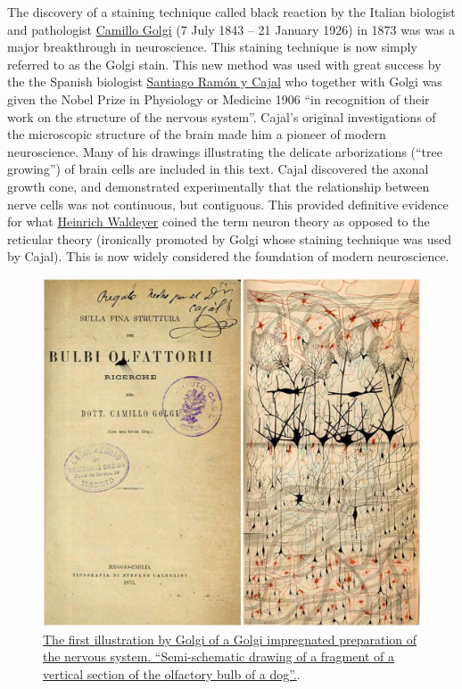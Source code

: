 The discovery of a staining technique called black reaction by the Italian biologist and pathologist \href{https://en.wikipedia.org/wiki/Camillo_Golgi}{Camillo Golgi} (7 July 1843 -- 21 January 1926) in 1873 was was a major breakthrough in neuroscience. This staining technique is now simply referred to as the Golgi stain. This new method was used with great success by the the Spanish biologist \href{https://en.wikipedia.org/wiki/Santiago_Ramón_y_Cajal}{Santiago Ramón y Cajal} who together with Golgi was given the Nobel Prize in Physiology or Medicine 1906 ``in recognition of their work on the structure of the nervous system''. Cajal's original investigations of the microscopic structure of the brain made him a pioneer of modern neuroscience. Many of his drawings illustrating the delicate arborizations (``tree growing'') of brain cells are included in this text. Cajal discovered the axonal growth cone, and demonstrated experimentally that the relationship between nerve cells was not continuous, but contiguous. This provided definitive evidence for what \href{https://en.wikipedia.org/wiki/Heinrich_Wilhelm_Gottfried_von_Waldeyer-Hartz}{Heinrich Waldeyer} coined the term neuron theory as opposed to the reticular theory (ironically promoted by Golgi whose staining technique was used by Cajal). This is now widely considered the foundation of modern neuroscience.



\begin{figure}

{\centering \includegraphics[width=0.7\linewidth]{./figures/nervoussystem/fnana-09-00014-g001} 

}

\caption{\href{https://www.frontiersin.org/articles/10.3389/fnana.2015.00014/full}{The first illustration by Golgi of a Golgi impregnated preparation of the nervous system. ``Semi-schematic drawing of a fragment of a vertical section of the olfactory bulb of a dog''.}.}\label{fig:golgifig}
\end{figure}

